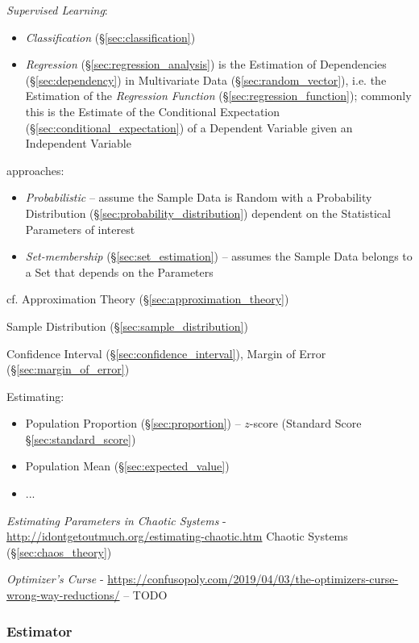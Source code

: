 \fist \emph{Supervised Learning}:
\begin{itemize}
  \item \emph{Classification} (\S\ref{sec:classification})
  \item \emph{Regression} (\S\ref{sec:regression_analysis}) is the Estimation of
    Dependencies (\S\ref{sec:dependency}) in Multivariate Data
    (\S\ref{sec:random_vector}), i.e. the Estimation of the \emph{Regression
      Function} (\S\ref{sec:regression_function}); commonly this is the Estimate
    of the Conditional Expectation (\S\ref{sec:conditional_expectation}) of a
    Dependent Variable given an Independent Variable
\end{itemize}

approaches:
\begin{itemize}
  \item \emph{Probabilistic} -- assume the Sample Data is Random with a
    Probability Distribution (\S\ref{sec:probability_distribution}) dependent on
    the Statistical Parameters of interest
  \item \emph{Set-membership} (\S\ref{sec:set_estimation}) -- assumes the
    Sample Data belongs to a Set that depends on the Parameters
\end{itemize}

\fist cf. Approximation Theory (\S\ref{sec:approximation_theory})

Sample Distribution (\S\ref{sec:sample_distribution})

Confidence Interval (\S\ref{sec:confidence_interval}), Margin of Error
(\S\ref{sec:margin_of_error})

Estimating:
\begin{itemize}
  \item Population Proportion (\S\ref{sec:proportion}) -- $z$-score (Standard
    Score \S\ref{sec:standard_score})
  \item Population Mean (\S\ref{sec:expected_value})
  \item ...
\end{itemize}

\emph{Estimating Parameters in Chaotic Systems} -
\url{http://idontgetoutmuch.org/estimating-chaotic.htm} \fist Chaotic Systems
(\S\ref{sec:chaos_theory})

\asterism

\emph{Optimizer's Curse} -
\url{https://confusopoly.com/2019/04/03/the-optimizers-curse-wrong-way-reductions/}
-- TODO



\subsubsection{Estimator}\label{sec:estimator}

